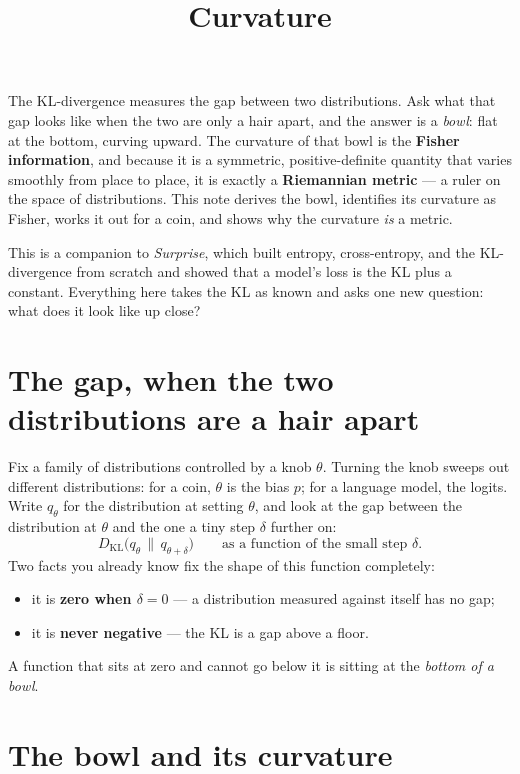 \documentclass[11pt]{article}
\title{\color{inkblue}\bfseries Curvature}
\author{}
\date{}
\begin{document}
\maketitle
\thispagestyle{empty}

\begin{summary}
The KL-divergence measures the gap between two distributions. Ask what that gap looks like when
the two are only a hair apart, and the answer is a \emph{bowl}: flat at the bottom, curving
upward. The curvature of that bowl is the \textbf{Fisher information}, and because it is a
symmetric, positive-definite quantity that varies smoothly from place to place, it is exactly a
\textbf{Riemannian metric} --- a ruler on the space of distributions. This note derives the
bowl, identifies its curvature as Fisher, works it out for a coin, and shows why the curvature
\emph{is} a metric.
\end{summary}

This is a companion to \emph{Surprise}, which built entropy, cross-entropy, and the
KL-divergence from scratch and showed that a model's loss is the KL plus a constant. Everything
here takes the KL as known and asks one new question: what does it look like up close?

\section{The gap, when the two distributions are a hair apart}

Fix a family of distributions controlled by a knob $\theta$. Turning the knob sweeps out
different distributions: for a coin, $\theta$ is the bias $p$; for a language model, the logits.
Write $q_\theta$ for the distribution at setting $\theta$, and look at the gap between the
distribution at $\theta$ and the one a tiny step $\delta$ further on:
\[
  D_{\mathrm{KL}}\big(q_\theta \,\|\, q_{\theta+\delta}\big) \qquad\text{as a function of the small step }\delta.
\]
Two facts you already know fix the shape of this function completely:
\begin{itemize}[leftmargin=1.4em]
  \item it is \textbf{zero when $\delta = 0$} --- a distribution measured against itself has no gap;
  \item it is \textbf{never negative} --- the KL is a gap above a floor.
\end{itemize}
A function that sits at zero and cannot go below it is sitting at the \emph{bottom of a bowl}.

\section{The bowl and its curvature}
\end{document}
